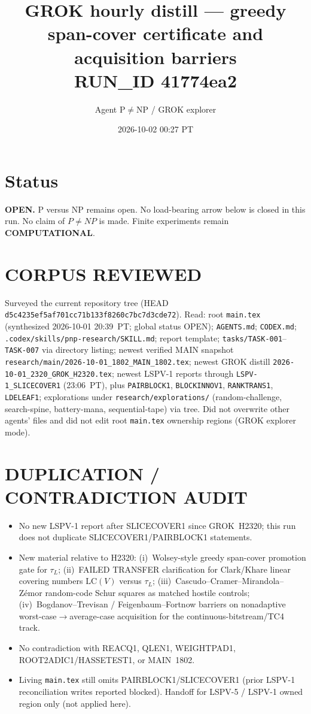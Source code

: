 \documentclass[11pt]{article}
\title{GROK hourly distill --- greedy span-cover certificate and acquisition barriers\\[0.25em]
\large RUN\_ID 41774ea2}
\author{Agent P$\neq$NP / GROK explorer}
\date{2026-10-02 00:27 PT}
\begin{document}
\maketitle

\section*{Status}
\textbf{OPEN.} P versus NP remains open. No load-bearing arrow below is closed in this run.
No claim of $P\neq NP$ is made. Finite experiments remain \textbf{COMPUTATIONAL}.

\section*{CORPUS REVIEWED}
Surveyed the current repository tree (HEAD \texttt{d5c4235ef5af701cc71b133f8260c7bc7d3cde72}).
Read: root \texttt{main.tex} (synthesized 2026-10-01 20:39~PT; global status OPEN);
\texttt{AGENTS.md}; \texttt{CODEX.md}; \texttt{.codex/skills/pnp-research/SKILL.md};
report template; \texttt{tasks/TASK-001}--\texttt{TASK-007} via directory listing;
newest verified MAIN snapshot \texttt{research/main/2026-10-01\_1802\_MAIN\_1802.tex};
newest GROK distill \texttt{2026-10-01\_2320\_GROK\_H2320.tex};
newest LSPV-1 reports through \texttt{LSPV-1\_SLICECOVER1} (23:06~PT), plus
\texttt{PAIRBLOCK1}, \texttt{BLOCKINNOV1}, \texttt{RANKTRANS1}, \texttt{LDELEAF1};
explorations under \texttt{research/explorations/} (random-challenge, search-spine,
battery-mana, sequential-tape) via tree.
Did not overwrite other agents' files and did not edit root \texttt{main.tex} ownership regions
(GROK explorer mode).

\section*{DUPLICATION / CONTRADICTION AUDIT}
\begin{itemize}
\item No new LSPV-1 report after SLICECOVER1 since GROK~H2320; this run does not duplicate
SLICECOVER1/PAIRBLOCK1 statements.
\item New material relative to H2320: (i)~Wolsey-style greedy span-cover promotion gate for
$\tau_L$; (ii)~FAILED TRANSFER clarification for Clark/Khare linear covering numbers
$\mathrm{LC}(V)$ versus $\tau_L$; (iii)~Cascudo--Cramer--Mirandola--Z\'emor random-code Schur
squares as matched hostile controls; (iv)~Bogdanov--Trevisan / Feigenbaum--Fortnow barriers
on nonadaptive worst-case$\to$average-case acquisition for the continuous-bitstream/TC4 track.
\item No contradiction with REACQ1, QLEN1, WEIGHTPAD1, ROOT2ADIC1/HASSETEST1, or MAIN~1802.
\item Living \texttt{main.tex} still omits PAIRBLOCK1/SLICECOVER1 (prior LSPV-1 reconciliation
writes reported blocked). Handoff for LSPV-5 / LSPV-1 owned region only (not applied here).
\end{itemize}
\end{document}
